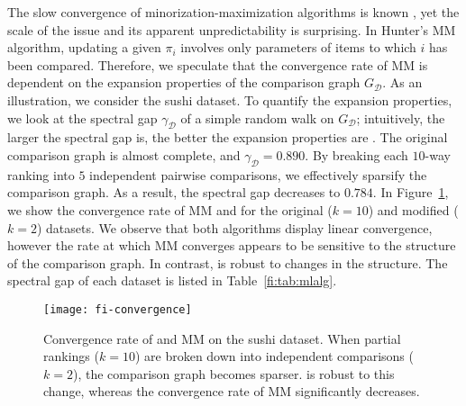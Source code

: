 The slow convergence of minorization-maximization algorithms is known \cite{hunter2004mm}, yet the scale of the issue and its apparent unpredictability is surprising.
In Hunter's MM algorithm, updating a given $\pi_i$ involves only parameters of items to which $i$ has been compared.
Therefore, we speculate that the convergence rate of MM is dependent on the expansion properties of the comparison graph $G_{\mathcal{D}}$.
As an illustration, we consider the sushi dataset.
To quantify the expansion properties, we look at the spectral gap $\gamma_{\mathcal{D}}$ of a simple random walk on $G_{\mathcal{D}}$;
intuitively, the larger the spectral gap is, the better the expansion properties are \citep{levin2008markov}.
The original comparison graph is almost complete, and $\gamma_{\mathcal{D}} = 0.890$.
By breaking each $10$-way ranking into $5$ independent pairwise comparisons, we effectively sparsify the comparison graph.
As a result, the spectral gap decreases to $0.784$.
In Figure~\ref{fi:fig:convergence}, we show the convergence rate of MM and \ILSR{} for the original ($k = 10$) and modified ($k = 2$) datasets.
We observe that both algorithms display linear convergence, however the rate at which MM converges appears to be sensitive to the structure of the comparison graph.
In contrast, \ILSR{} is robust to changes in the structure.
The spectral gap of each dataset is listed in Table~\ref{fi:tab:mlalg}.


\begin{figure}[ht]
\centering
\texttt{[image: fi-convergence]}
\caption{
Convergence rate of \ILSR{} and MM on the sushi dataset.
When partial rankings ($k = 10$) are broken down into independent comparisons ($k = 2$), the comparison graph becomes sparser.
\ILSR{} is robust to this change, whereas the convergence rate of MM significantly decreases.
}
\label{fi:fig:convergence}
\end{figure}
